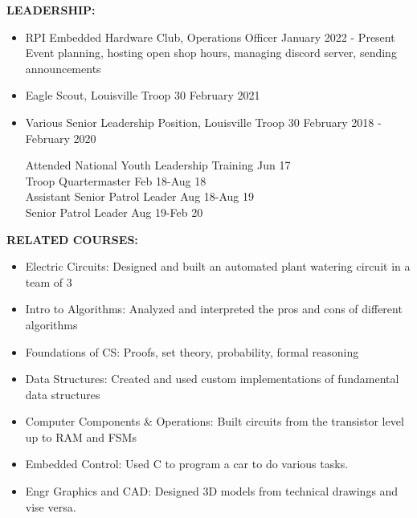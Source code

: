 \documentclass[11pt]{article}
\begin{document}
\textbf{LEADERSHIP:}
\begin{itemize}
\setlength\itemsep{-.37em}
    \item RPI Embedded Hardware Club, Operations Officer \hfill January 2022 - Present \\ 
    Event planning, hosting open shop hours, managing discord server, sending announcements
    \item Eagle Scout, Louisville Troop 30 \hfill February 2021
    \item Various Senior Leadership Position, Louisville Troop 30 \hfill February 2018 - February 2020
    \begin{addmargin}[1em]{2em}
        Attended National Youth Leadership Training \hfill Jun 17 \\
        Troop Quartermaster \hfill Feb 18-Aug 18 \\
        Assistant Senior Patrol Leader \hfill Aug 18-Aug 19 \\
        Senior Patrol Leader \hfill Aug 19-Feb 20
    \end{addmargin}
\end{itemize}

\textbf{RELATED COURSES:}
\begin{itemize}
\setlength\itemsep{-.37em}
    \item Electric Circuits: Designed and built an automated plant watering circuit in a team of 3
    \item Intro to Algorithms: Analyzed and interpreted the pros and cons of different algorithms
    \item Foundations of CS: Proofs, set theory, probability, formal reasoning
    \item Data Structures: Created and used custom implementations of fundamental data structures
    \item Computer Components \& Operations: Built circuits from the transistor level up to RAM and FSMs
    \item Embedded Control: Used C to program a car to do various tasks.
    \item Engr Graphics and CAD: Designed 3D models from technical drawings and vise versa.
\end{itemize}
\end{document}
